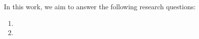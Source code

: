 



In this work, we aim to answer the following research questions:
\begin{enumerate}
	\item 
	\item 
	
\end{enumerate}
